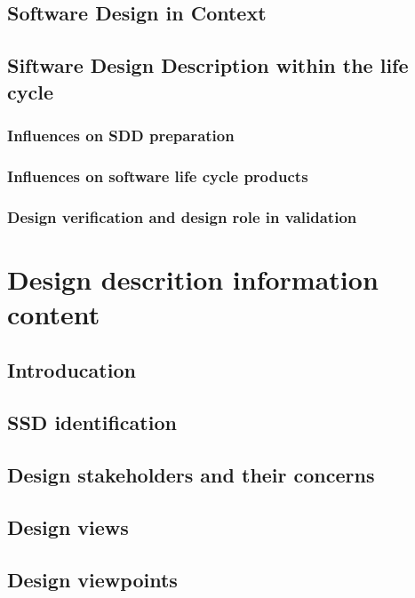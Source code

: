 \documentclass{scrreprt}
\begin{document}
\subsection{Software Design in Context}

\subsection{Siftware Design Description within the life cycle}

\subsubsection{Influences on SDD preparation}

\subsubsection{Influences on software life cycle products}

\subsubsection{Design verification and design role in validation}

\section{Design descrition information content}

\subsection{Introducation}

\subsection{SSD identification}

\subsection{Design stakeholders and their concerns}

\subsection{Design views}

\subsection{Design viewpoints}
\end{document}
